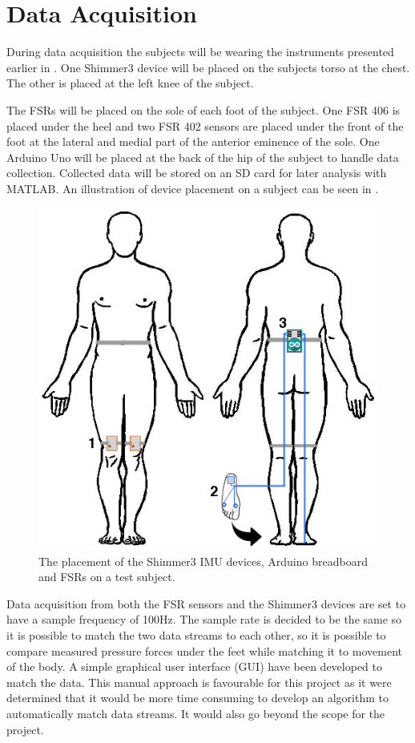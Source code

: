 \section{Data Acquisition}

During data acquisition the subjects will be wearing the instruments presented earlier in . One Shimmer3 device will be placed on the subjects torso at the chest. The other is placed at the left knee of the subject. 

The FSRs will be placed on the sole of each foot of the subject. One FSR 406 is placed under the heel and two FSR 402 sensors are placed under the front of the foot at the lateral and medial part of the anterior eminence of the sole. One Arduino Uno will be placed at the back of the hip of the subject to handle data collection. Collected data will be stored on an SD card for later analysis with MATLAB. An illustration of device placement on a subject can be seen in . 


\begin{figure}[H]
	\includegraphics[width=.6\textwidth]{figures/bodySysSetup}
	\caption{The placement of the Shimmer3 IMU devices, Arduino breadboard and FSRs on a test subject.}
	\label{fig:bodySysSetup}  %
\end{figure}

Data acquisition from both the FSR sensors and the Shimmer3 devices are set to have a sample frequency of 100Hz. The sample rate is decided to be the same so it is possible to match the two data streams to each other, so it is possible to compare measured pressure forces under the feet while matching it to movement of the body. A simple graphical user interface (GUI) have been developed to match the data. This manual approach is favourable for this project as it were determined that it would be more time consuming to develop an algorithm to automatically match data streams. It would also go beyond the scope for the project.




